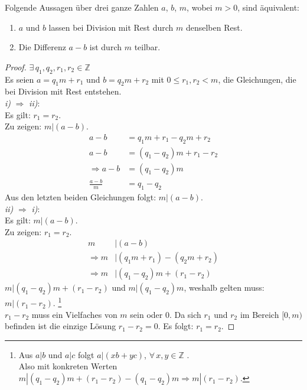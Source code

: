 \begin{lemma}
  Folgende Aussagen über drei ganze Zahlen $a$, $b$, $m$, wobei $m > 0$, sind äquivalent:
  \begin{enumerate}[label=\roman*), itemsep = 0pt]
    \item $a$ und $b$ lassen bei Division mit Rest durch $m$ denselben Rest.
    \item Die Differenz $a - b$ ist durch $m$ teilbar.
  \end{enumerate}
\end{lemma}
\begin{proof}
  $\exists \, q_1,q_2,r_1,r_2 \in \mathbb{Z}$ \\
  Es seien $a = q_1m + r_1$ und $b = q_2m + r_2$ mit $0 \leq r_1,r_2 < m$,
  die Gleichungen, die bei Division mit Rest entstehen. \\
  \textit{i)} $\Rightarrow$ \textit{ii)}: \\
  Es gilt: $r_1 = r_2$. \\
  Zu zeigen: $m|(a-b)$.
  \begin{align*}
    a - b             & = q_1m + r_1 - q_2m + r_2  \\
    a - b             & = (q_1 - q_2)m + r_1 - r_2 \\
    \Rightarrow a - b & = (q_1 - q_2)m             \\
    \frac{a - b}{m}   & = q_1 - q_2
  \end{align*}
  Aus den letzten beiden Gleichungen folgt: $m | (a - b)$. \\
  \textit{ii)} $\Rightarrow$ \textit{i)}: \\
  Es gilt: $m | (a - b)$. \\
  Zu zeigen: $r_1 = r_2$.
  \begin{align*}
    m             & | (a - b)                     \\
    \Rightarrow m & | (q_1m + r_1) - (q_2m + r_2) \\
    \Rightarrow m & | (q_1 - q_2)m + (r_1 - r_2)
  \end{align*}
  $m|(q_1 - q_2)m + (r_1 - r_2)$ und $m|(q_1 - q_2)m$, weshalb gelten muss: $m|(r_1 - r_2)$.
  \footnote{Aus $a|b$ und $a|c$ folgt $a|(xb + yc)$,
    $\forall \, x,y \in \mathbb{Z}$ \parencite[23]{BOOK:numberTheory}. \\
    Also mit konkreten Werten $m|(q_1 - q_2)m + (r_1 - r_2) - (q_1 - q_2)m \Rightarrow m|(r_1 - r_2)$.} \\
  $r_1 - r_2$ muss ein Vielfaches von $m$ sein oder 0. Da sich $r_1$ und $r_2$ im Bereich
  $[0,m)$ befinden ist die einzige Lösung $r_1 - r_2 = 0$. Es folgt: $r_1 = r_2$.
\end{proof}

